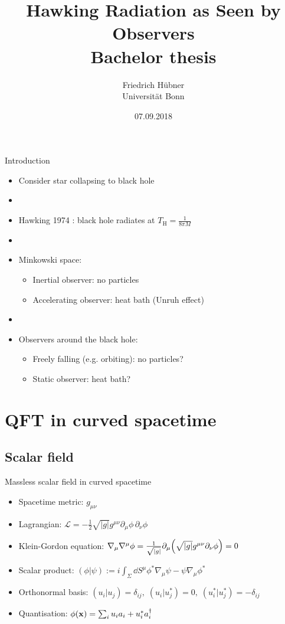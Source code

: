 \documentclass{beamer}
\title[Hawking Radiation for Observers]{\vspace{1cm}Hawking Radiation as Seen by Observers\\\small{Bachelor thesis}}
\author[Friedrich Hübner]{Friedrich Hübner\\Universität Bonn}
\date{07.09.2018}
\newcommand{\ind}[1]{_\mathrm{#1}}
\begin{document}
\beamertemplatenavigationsymbolsempty
\titlepage

\begin{frame}{Introduction}
\begin{itemize}
	\item Consider star collapsing to black hole
	\item[]
	\item Hawking 1974 \cite{hawking}: black hole radiates at \(T\ind{H} = \frac{1}{8\pi M}\)
	\item[]
	\item Minkowski space:
		\begin{itemize}
			\item Inertial observer: no particles
			\item Accelerating observer: heat bath (Unruh effect)
		\end{itemize}		 
	\item[]
	\item Observers around the black hole:
		\begin{itemize}
			\item Freely falling (e.g. orbiting): no particles?
			\item Static observer: heat bath?
		\end{itemize}
\end{itemize}
\end{frame}

\frame{\setcounter{tocdepth}{1}\hspace{1cm}\tableofcontents}

\section{QFT in curved spacetime}
\subsection{Scalar field}
\begin{frame}{Massless scalar field in curved spacetime\cite{davies}}
\begin{itemize}
	\item Spacetime metric: \(g_{\mu\nu}\)
	\item Lagrangian: \(\mathcal{L} = -\frac{1}{2}\sqrt{|g|} g^{\mu\nu} \partial_\mu \phi\,\partial_\nu \phi\)
	\item Klein-Gordon equation: \(\nabla_\mu\nabla^\mu \phi = \frac{1}{\sqrt{|g|}}\partial_\mu \qty(\sqrt{|g|} g^{\mu\nu} \partial_\nu \phi) = 0\)
	\item Scalar product: \((\phi|\psi) := i \int_{\Sigma}\dd{S^\mu} \phi^*\nabla_\mu \psi - \psi\nabla_\mu \phi^*\)
	\item Orthonormal basis: \((u_i|u_j) = \delta_{ij},\;(u_i|u_j^*) = 0,\;(u_i^*|u_j^*) = -\delta_{ij}\)
	\item Quantisation: \(\phi(\vb{x}) = \sum_i u_i a_i + u_i^*a_i^\dagger\)
\end{itemize}
\end{frame}
\end{document}
